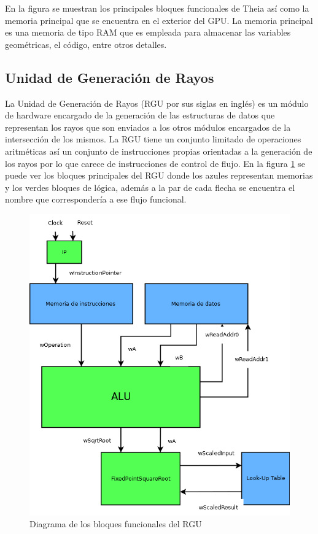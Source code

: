 En la figura se muestran los principales bloques funcionales de Theia así como la memoria principal que se encuentra en el exterior del GPU. La memoria principal es una memoria de tipo RAM que es empleada para almacenar las variables geométricas, el código, entre otros detalles.

\subsection{Unidad de Generación de Rayos}

La Unidad de Generación de Rayos (RGU por sus siglas en inglés) es un módulo de hardware encargado de la generación de las estructuras de datos que representan los rayos que son enviados a los otros módulos encargados de la intersección de los mismos. La RGU tiene un conjunto limitado de operaciones aritméticas así un conjunto de instrucciones propias orientadas a la generación de los rayos por lo que carece de instrucciones de control de flujo. En la figura \ref{fig:rgu} se puede ver los bloques principales del RGU donde los azules representan memorias y los verdes bloques de lógica, además a la par de cada flecha se encuentra el nombre que correspondería a ese flujo funcional.

\begin{figure}
	\includegraphics[width=1\linewidth]{images/rgu}
	\caption{Diagrama de los bloques funcionales del RGU} \label{fig:rgu}
\end{figure}

